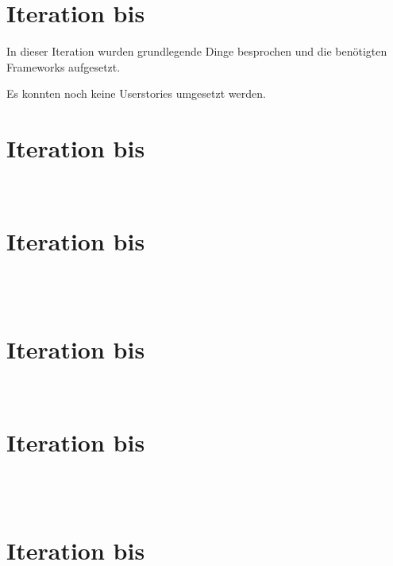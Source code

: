 

	\maketitle

	\section{Iteration bis }
	In dieser Iteration wurden grundlegende Dinge besprochen und die benötigten Frameworks aufgesetzt.

	Es konnten noch keine Userstories umgesetzt werden. 

	\section{Iteration bis } %

	 \\
	


	\section{Iteration bis } %

	 \\
	 \\
	


	\section{Iteration bis } %

	 \\
	


	\section{Iteration bis } %

	\\
	\\
	

	\section{Iteration bis } %

